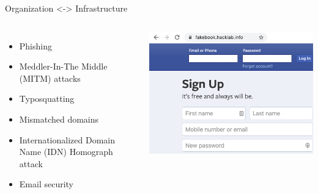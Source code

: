 \documentclass[nobackground,dvipsnames,table]{beamer}
\begin{document}
\begin{frame}{Organization <-> Infrastructure }
    \begin{columns}
            \begin{itemize}
                \item Phishing 
                \item Meddler-In-The Middle (MITM) attacks
                \item Typosquatting
                \item Mismatched domains
                \item Internationalized Domain Name (IDN) Homograph attack
                \item Email security
            \end{itemize}
            \includegraphics[width=\textwidth]{fakebook-login}
    \end{columns}
\end{frame}
\end{document}
